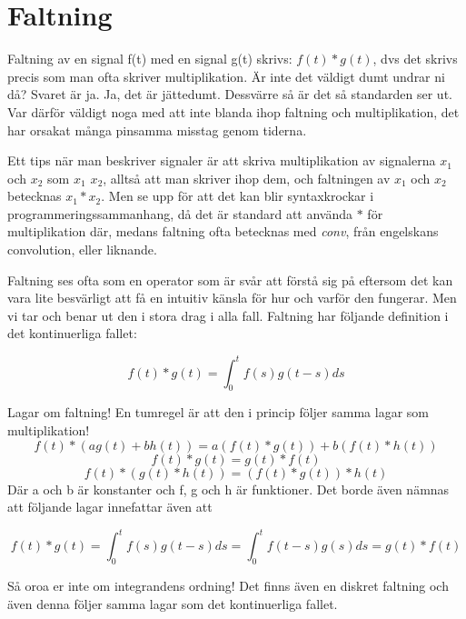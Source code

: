 \documentclass{article}
\begin{document}
\section{Faltning}

Faltning av en signal f(t) med en signal g(t) skrivs: $f(t)*g(t)$, dvs det
skrivs precis som man ofta skriver multiplikation. Är inte det väldigt dumt
undrar ni då? Svaret är ja. Ja, det är jättedumt. Dessvärre så är det så
standarden ser ut. Var därför väldigt noga med att inte blanda ihop faltning
och multiplikation, det har orsakat många pinsamma misstag genom tiderna.
\newline

Ett tips när man beskriver signaler är att skriva multiplikation
av signalerna $x_1$ och $x_2$ som \emph{$x_1$ $x_2$}, alltså att man skriver ihop dem,
och faltningen av $x_1$ och $x_2$ betecknas $x_1 * x_2$. Men se upp för att det
kan blir syntaxkrockar i programmeringssammanhang, då det är standard att
använda $*$ för multiplikation där, medans faltning ofta betecknas med \emph{conv}, från engelskans convolution, eller liknande.


Faltning ses ofta som en operator som är svår att förstå sig på eftersom
det kan vara lite besvärligt att få en intuitiv känsla för hur och varför
den fungerar. Men vi tar och benar ut den i stora drag i alla fall.
Faltning har följande definition i det kontinuerliga fallet:

$$ f(t) * g(t) = \int_{0}^t  f(s) g(t-s) ds $$

Lagar om faltning! En tumregel är att den i princip följer samma lagar som multiplikation!
$$f(t) * (a g(t) + b h(t) ) = a(f(t) * g(t)) + b(f(t) * h(t))$$ %
$$f(t) * g(t) = g(t) * f(t) $$ %
$$f(t) * (g(t) * h(t)) = (f(t) * g(t)) * h(t) $$ %
Där a och b är konstanter och f, g och h är funktioner. Det borde även nämnas att följande lagar innefattar även att

$$ f(t) * g(t) = \int_{0}^t  f(s) g(t-s) ds = \int_{0}^t  f(t-s) g(s) ds = g(t) * f(t) $$

Så oroa er inte om integrandens ordning! Det finns även en diskret faltning och även denna följer samma lagar som det kontinuerliga fallet.


\end{document}
